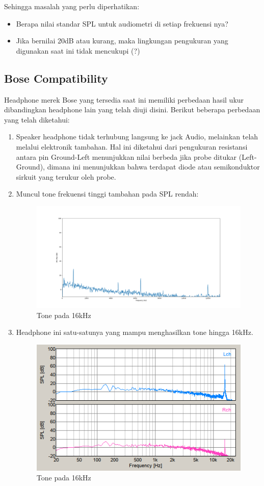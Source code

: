 \documentclass[12pt,]{article}
\begin{document}
	Sehingga masalah yang perlu diperhatikan:
	\begin{itemize}
		\item Berapa nilai standar SPL untuk audiometri di setiap frekuensi nya?
		\item Jika bernilai 20dB atau kurang, maka lingkungan pengukuran yang digunakan saat ini tidak mencukupi (?)
	\end{itemize}
	
	\subsection{Bose Compatibility}
	
	Headphone merek Bose yang tersedia saat ini memiliki perbedaan hasil ukur dibandingkan headphone lain yang telah diuji disini.
	Berikut beberapa perbedaan yang telah diketahui:
	
	\begin{enumerate}
		\item Speaker headphone tidak terhubung langsung ke jack Audio, melainkan telah melalui elektronik tambahan.
		Hal ini diketahui dari pengukuran resistansi antara pin Ground-Left menunjukkan nilai berbeda jika probe ditukar (Left-Ground),
		dimana ini menunjukkan bahwa terdapat diode atau semikonduktor sirkuit yang terukur oleh probe.
		
		\item Muncul tone frekuensi tinggi tambahan pada SPL rendah:
		\begin{figure}[!ht]
			\centering
			\includegraphics[width=300pt]{hasil/bose/maxallfreq/low_noise}
			\caption{Tone pada 16kHz}
		\end{figure}
		
		\newpage
		\item Headphone ini satu-satunya yang mampu menghasilkan tone hingga 16kHz.
		\begin{figure}[!ht]
			\centering
			\includegraphics[width=300pt]{hasil/bose/maxallfreq/16000}
			\caption{Tone pada 16kHz}
		\end{figure}
	\end{enumerate}
	
\end{document}
